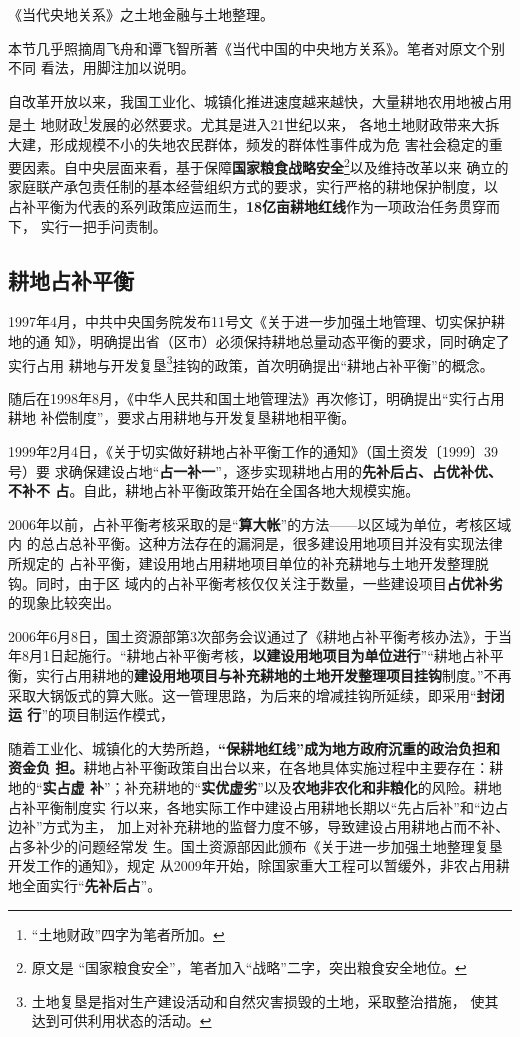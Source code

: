 《当代央地关系》之土地金融与土地整理。

本节几乎照摘周飞舟和谭飞智所著《当代中国的中央地方关系》。笔者对原文个别不同
看法，用脚注加以说明。

自改革开放以来，我国工业化、城镇化推进速度越来越快，大量耕地农用地被占用是土
地财政\footnote{“土地财政”四字为笔者所加。}发展的必然要求。尤其是进入21世纪以来，
各地土地财政带来大拆大建，形成规模不小的失地农民群体，频发的群体性事件成为危
害社会稳定的重要因素。自中央层面来看，基于保障\textbf{国家粮食战略安全}\footnote{原文是
“国家粮食安全”，笔者加入“战略”二字，突出粮食安全地位。}以及维持改革以来
确立的家庭联产承包责任制的基本经营组织方式的要求，实行严格的耕地保护制度，以
占补平衡为代表的系列政策应运而生，\textbf{18亿亩耕地红线}作为一项政治任务贯穿而下，
实行一把手问责制。

\subsection{耕地占补平衡}

1997年4月，中共中央国务院发布11号文《关于进一步加强土地管理、切实保护耕地的通
知》，明确提出省（区市）必须保持耕地总量动态平衡的要求，同时确定了实行占用
耕地与开发复垦\footnote{土地复垦是指对生产建设活动和自然灾害损毁的土地，采取整治措施，
  使其达到可供利用状态的活动。}挂钩的政策，首次明确提出“耕地占补平衡”的概念。

随后在1998年8月，《中华人民共和国土地管理法》再次修订，明确提出“实行占用耕地
补偿制度”，要求占用耕地与开发复垦耕地相平衡。

1999年2月4日，《关于切实做好耕地占补平衡工作的通知》（国土资发〔1999〕39号）要
求确保建设占地“\textbf{占一补一}”，逐步实现耕地占用的\textbf{先补后占、占优补优、不补不
  占}。自此，耕地占补平衡政策开始在全国各地大规模实施。

2006年以前，占补平衡考核采取的是“\textbf{算大帐}”的方法——以区域为单位，考核区域内
的总占总补平衡。这种方法存在的漏洞是，很多建设用地项目并没有实现法律所规定的
占补平衡，建设用地占用耕地项目单位的补充耕地与土地开发整理脱钩。同时，由于区
域内的占补平衡考核仅仅关注于数量，一些建设项目\textbf{占优补劣}的现象比较突出。

2006年6月8日，国土资源部第3次部务会议通过了《耕地占补平衡考核办法》，于当
年8月1日起施行。“耕地占补平衡考核，\textbf{以建设用地项目为单位进行}”“耕地占补平
衡，实行占用耕地的\textbf{建设用地项目与补充耕地的土地开发整理项目挂钩}制度。”不再
采取大锅饭式的算大账。这一管理思路，为后来的增减挂钩所延续，即采用“\textbf{封闭运
  行}”的项目制运作模式，

随着工业化、城镇化的大势所趋，\textbf{“保耕地红线”成为地方政府沉重的政治负担和资金负
担。}耕地占补平衡政策自出台以来，在各地具体实施过程中主要存在：耕地的“\textbf{实占虚
补}”；补充耕地的“\textbf{实优虚劣}”以及\textbf{农地非农化和非粮化}的风险。耕地占补平衡制度实
行以来，各地实际工作中建设占用耕地长期以“先占后补”和“边占边补”方式为主，
加上对补充耕地的监督力度不够，导致建设占用耕地占而不补、占多补少的问题经常发
生。国土资源部因此颁布《关于进一步加强土地整理复垦开发工作的通知》，规定
从2009年开始，除国家重大工程可以暂缓外，非农占用耕地全面实行“\textbf{先补后占}”。

